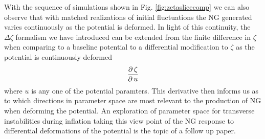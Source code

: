 \Fzetaslicecomp

\Fpotparamcomp

With the sequence of simulations shown in Fig. \ref{fig:zetaslicecomp} we can also observe that with matched realizations of initial fluctuations the NG generated varies continuously as the potential is deformed. In light of this continuity, the $\Delta\zeta$ formalism we have introduced can be extended from the finite difference in $\zeta$ when comparing to a baseline potential to a differential modification to $\zeta$ as the potential is continuously deformed
\begin{equation}
  \frac{\partial\, \zeta}{\partial\, u}
\end{equation}
where $u$ is any one of the potential paramters.
This derivative then informs us as to which directions in parameter space are most relevant to the production of NG when deforming the potential. An exploration of parameter space for transverse instabilities during inflation taking this view point of the NG response to differential deformations of the potential is the topic of a follow up paper. 

%


